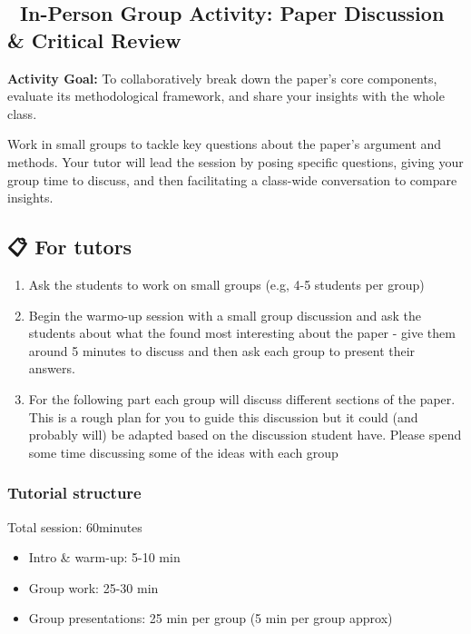 \documentclass[
  letterpaper,
  DIV=11,
  numbers=noendperiod]{scrartcl}
\providecommand{\tightlist}{%
  \setlength{\itemsep}{0pt}\setlength{\parskip}{0pt}}\usepackage{longtable,booktabs,array}
\begin{document}
\subsection{\texorpdfstring{👥 \textbf{In-Person Group Activity: Paper
Discussion \& Critical
Review}}{👥 In-Person Group Activity: Paper Discussion \& Critical Review}}\label{in-person-group-activity-paper-discussion-critical-review}

\textbf{Activity Goal:} To collaboratively break down the paper's core
components, evaluate its methodological framework, and share your
insights with the whole class.

Work in small groups to tackle key questions about the paper's argument
and methods. Your tutor will lead the session by posing specific
questions, giving your group time to discuss, and then facilitating a
class-wide conversation to compare insights.

\subsection{📋 For tutors}\label{for-tutors}

\begin{enumerate}
\def\labelenumi{\arabic{enumi}.}
\tightlist
\item
  Ask the students to work on small groups (e.g, 4-5 students per group)
\item
  Begin the warmo-up session with a small group discussion and ask the
  students about what the found most interesting about the paper - give
  them around 5 minutes to discuss and then ask each group to present
  their answers.
\item
  For the following part each group will discuss different sections of
  the paper. This is a rough plan for you to guide this discussion but
  it could (and probably will) be adapted based on the discussion
  student have. Please spend some time discussing some of the ideas with
  each group
\end{enumerate}

\subsubsection{Tutorial structure}\label{tutorial-structure}

Total session: 60minutes

\begin{itemize}
\item
  Intro \& warm-up: 5-10 min
\item
  Group work: 25-30 min
\item
  Group presentations: 25 min per group (5 min per group approx)
\end{itemize}
\end{document}
